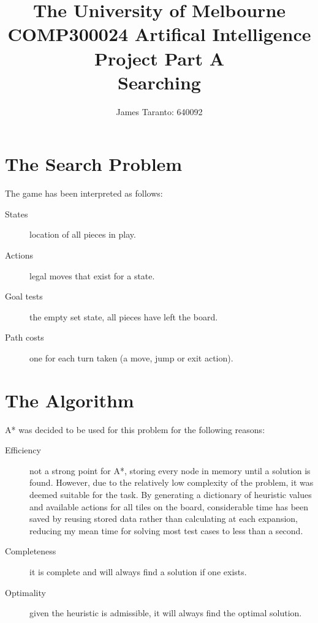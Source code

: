 \documentclass[a4paper,10pt,draft]{article}
\title{
	{\small
	The University of Melbourne\\
	COMP300024 Artifical Intelligence\\[0.2em]
	}
    Project Part A\\[0.2em]
    \small Searching\\
}
\author{
    James Taranto: 640092
}
\begin{document}
\maketitle
\section{The Search Problem}
The game has been interpreted as follows:
\begin{description}
	\item[States] location of all pieces in play.
	\item[Actions] legal moves that exist for a state.
	\item[Goal tests] the empty set state, all pieces have left the board.
	\item[Path costs] one for each turn taken (a move, jump or exit action).
\end{description}
\section{The Algorithm}
A* was decided to be used for this problem for the following reasons:
\begin{description}
	\item[Efficiency] not a strong point for A*, storing every node in memory until a solution is found.
		However, due to the relatively low complexity of the problem, it was deemed suitable for the task.
		By generating a dictionary of heuristic values and available actions for all tiles on the board,
		considerable time has been saved by reusing stored data rather than calculating at each expansion,
		reducing my mean time for solving most test cases to less than a second.
	\item[Completeness] it is complete and will always find a solution if one exists.
	\item[Optimality] given the heuristic is admissible, it will always find the optimal solution.
\end{description}
\end{document}
